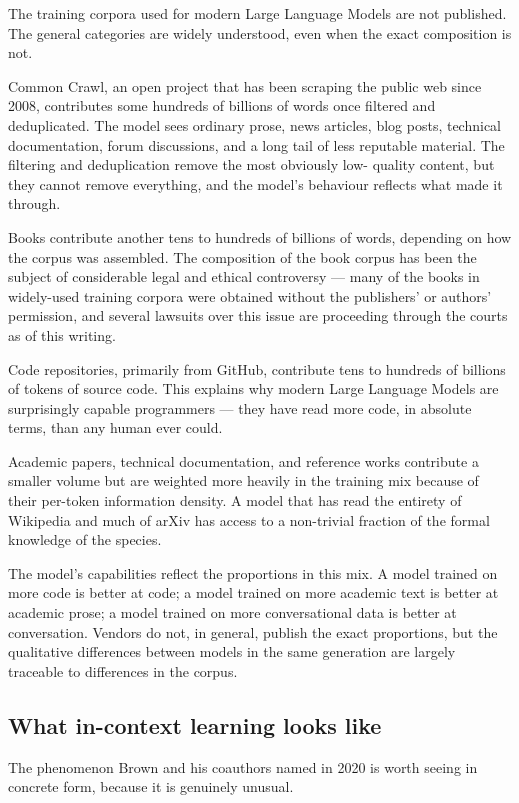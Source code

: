 The training corpora used for modern Large Language Models are
not published. The general categories are widely understood,
even when the exact composition is not.

Common Crawl, an open project that has been scraping the
public web since 2008, contributes some hundreds of billions of
words once filtered and deduplicated. The model sees ordinary
prose, news articles, blog posts, technical documentation,
forum discussions, and a long tail of less reputable material.
The filtering and deduplication remove the most obviously low-
quality content, but they cannot remove everything, and the
model's behaviour reflects what made it through.

Books contribute another tens to hundreds of billions of words,
depending on how the corpus was assembled. The composition of
the book corpus has been the subject of considerable legal and
ethical controversy --- many of the books in widely-used
training corpora were obtained without the publishers' or
authors' permission, and several lawsuits over this issue are
proceeding through the courts as of this writing.

Code repositories, primarily from GitHub, contribute tens to
hundreds of billions of tokens of source code. This explains
why modern Large Language Models are surprisingly capable
programmers --- they have read more code, in absolute terms,
than any human ever could.

Academic papers, technical documentation, and reference works
contribute a smaller volume but are weighted more heavily in
the training mix because of their per-token information
density. A model that has read the entirety of Wikipedia and
much of arXiv has access to a non-trivial fraction of the
formal knowledge of the species.

The model's capabilities reflect the proportions in this mix.
A model trained on more code is better at code; a model trained
on more academic text is better at academic prose; a model
trained on more conversational data is better at conversation.
Vendors do not, in general, publish the exact proportions, but
the qualitative differences between models in the same
generation are largely traceable to differences in the corpus.

\subsection*{What in-context learning looks like}

The phenomenon Brown and his coauthors named in 2020 is worth
seeing in concrete form, because it is genuinely unusual.

